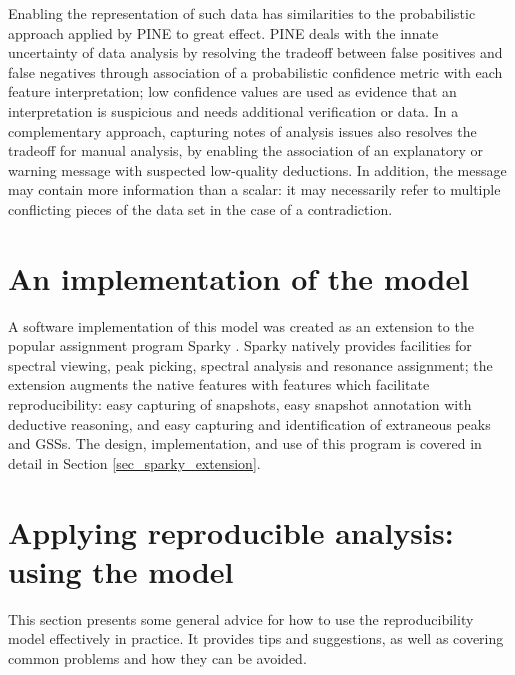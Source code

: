Enabling the representation of such data has similarities to the probabilistic
approach applied by PINE \cite{pine} to great effect.  
PINE deals with the innate uncertainty of data 
analysis by resolving the tradeoff between false positives and false 
negatives through association of a probabilistic confidence metric with each
feature interpretation; low confidence values are used as evidence that an
interpretation is suspicious and needs additional verification or data.
In a complementary approach, capturing notes of analysis issues also 
resolves the tradeoff for manual analysis, by enabling the association of
an explanatory or warning message with suspected low-quality deductions.
In addition, the message may contain more information than a scalar: it may
necessarily refer to multiple conflicting pieces of the data set in the case
of a contradiction.



\section{An implementation of the model}
A software implementation of this model was created as an extension to the
popular assignment program Sparky \cite{sparky}.  Sparky natively provides
facilities for spectral viewing, peak picking, spectral analysis and 
resonance assignment; the extension augments the native features with 
features which facilitate reproducibility: easy capturing of snapshots,
easy snapshot annotation with deductive reasoning, and easy capturing and
identification of extraneous peaks and GSSs.
The design, implementation, and use of this program is covered in 
detail in Section \ref{sec_sparky_extension}.



\section{Applying reproducible analysis: using the model}
This section presents some general advice for how to use the reproducibility
model effectively in practice.  It provides tips and suggestions, as well
as covering common problems and how they can be avoided.


